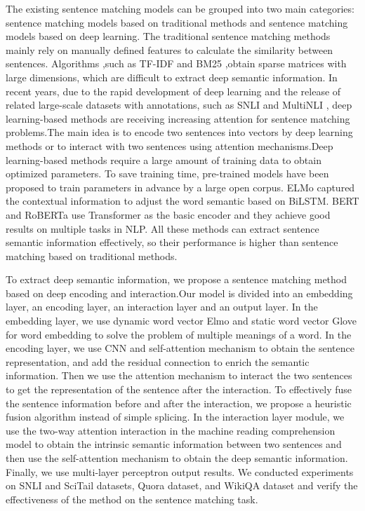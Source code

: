 \documentclass[review]{elsarticle}
\begin{document}
The existing sentence matching models can be grouped into two main categories:  sentence matching models based on traditional methods and sentence matching models based on deep learning. The traditional sentence matching methods mainly rely on manually defined features to calculate the similarity between sentences. Algorithms ,such as TF-IDF and BM25 \cite{robertson2009probabilistic} ,obtain sparse matrices with large dimensions, which are difficult to extract deep semantic information. In recent years, due to the rapid development of deep learning and the release of related large-scale datasets with annotations, such as SNLI \cite{bowman2015large} and MultiNLI \cite{williams2018broad}, deep learning-based methods are receiving increasing attention for sentence matching problems.The main idea is to encode two sentences into vectors by deep learning methods\cite{shen2020learning}\cite{zhou2016learning} or to interact with two sentences using attention mechanisms\cite{yang2019simple}\cite{kim2019semantic}.Deep learning-based methods require a large amount of
 training data to obtain optimized parameters. To save training time,
 pre-trained models have been proposed to train parameters in advance by a large open corpus. ELMo\cite{peters2018deep}  captured the contextual information to adjust the word semantic based on BiLSTM. BERT\cite{devlin2019bert} and RoBERTa\cite{liu2019roberta} use Transformer\cite{vaswani2017attention} as the basic encoder and they achieve good results on multiple tasks in NLP. All these methods can extract sentence semantic information effectively, so their performance is higher than sentence matching based on traditional methods. 

To extract deep semantic information, we propose a sentence matching method based on deep encoding and interaction.Our model is divided into an embedding layer, an encoding layer, an interaction layer and an output layer. In the embedding layer, we use dynamic word vector Elmo and static word vector Glove for word embedding to solve the problem of multiple meanings of a word. In the encoding layer, we use CNN and self-attention mechanism to obtain the sentence representation, and add the residual connection to enrich the semantic information. Then we  use the attention mechanism to interact the two sentences to get the representation of the sentence after the interaction. To  effectively fuse the sentence information before and after the interaction, we propose a heuristic fusion algorithm instead of simple splicing. In the interaction layer module, we use the two-way attention interaction in the machine reading comprehension model to obtain the intrinsic semantic information between two sentences and then use the self-attention mechanism to obtain the deep semantic information. Finally, 
we use multi-layer perceptron output results. We conducted experiments on SNLI and SciTail datasets, Quora dataset, and WikiQA dataset and verify the effectiveness of the method on the sentence matching task.   
\end{document}
